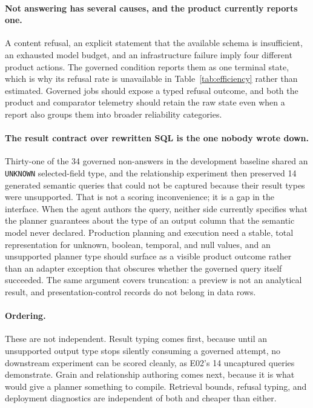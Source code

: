 \paragraph{Not answering has several causes, and the product currently reports
one.}
A content refusal, an explicit statement that the available schema is
insufficient, an exhausted model budget, and an infrastructure failure imply four
different product actions. The governed condition reports them as one terminal
state, which is why its refusal rate is unavailable in Table~\ref{tab:efficiency}
rather than estimated. Governed jobs should expose a typed refusal outcome, and
both the product and comparator telemetry should retain the raw state even when a
report also groups them into broader reliability categories.

\paragraph{The result contract over rewritten SQL is the one nobody wrote down.}
Thirty-one of the 34 governed non-answers in the development baseline shared an
\texttt{UNKNOWN} selected-field type, and the relationship experiment then
preserved 14 generated semantic queries that could not be captured because their
result types were unsupported. That is not a scoring inconvenience; it is a gap
in the interface. When the agent authors the query, neither side currently
specifies what the planner guarantees about the type of an output column that the
semantic model never declared. Production planning and execution need a stable,
total representation for unknown, boolean, temporal, and null values, and an
unsupported planner type should surface as a visible product outcome rather than
an adapter exception that obscures whether the governed query itself succeeded.
The same argument covers truncation: a preview is not an analytical result, and
presentation-control records do not belong in data rows.

\paragraph{Ordering.}
These are not independent. Result typing comes first, because until an unsupported
output type stops silently consuming a governed attempt, no downstream experiment
can be scored cleanly, as E02's 14 uncaptured queries demonstrate. Grain and
relationship authoring comes next, because it is what would give a planner
something to compile. Retrieval bounds, refusal typing, and deployment
diagnostics are independent of both and cheaper than either.

